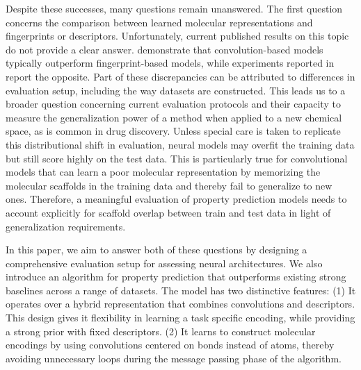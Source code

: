 \documentclass[journal=jcisd8,manuscript=article]{achemso}
\begin{document}
Despite these successes, many questions remain unanswered. The first question concerns the comparison between learned molecular representations and fingerprints or descriptors. Unfortunately, current published results on this topic do not provide a clear answer. \citeauthor{Wu_2018}\cite{Wu_2018} demonstrate that convolution-based models typically outperform fingerprint-based models, while experiments reported in \citeauthor{mayr2018chembl}\cite{mayr2018chembl} report the opposite. Part of these discrepancies can be attributed to differences in evaluation setup, including the way datasets are constructed. This leads us to a broader question concerning current evaluation protocols and their capacity to measure the generalization power of a method when applied to a new chemical space, as is common in drug discovery. Unless special care is taken to replicate this distributional shift in evaluation, neural models may overfit the training data but still score highly on the test data. This is particularly true for convolutional models that can learn a poor molecular representation by memorizing the molecular scaffolds in the training data and thereby fail to generalize to new ones. Therefore, a meaningful evaluation of property prediction models needs to account explicitly for scaffold overlap between train and test data in light of generalization requirements.

In this paper, we aim to answer both of these questions by designing a comprehensive evaluation setup for assessing neural architectures. We also introduce an algorithm for property prediction that outperforms existing strong baselines across a range of datasets. The model has two distinctive features: (1) It operates over a hybrid representation that combines convolutions and descriptors. This design gives it flexibility in learning a task specific encoding, while providing a strong prior with fixed descriptors. (2) It learns to construct molecular encodings by using convolutions centered on bonds instead of atoms, thereby avoiding unnecessary loops during the message passing phase of the algorithm.
\end{document}
